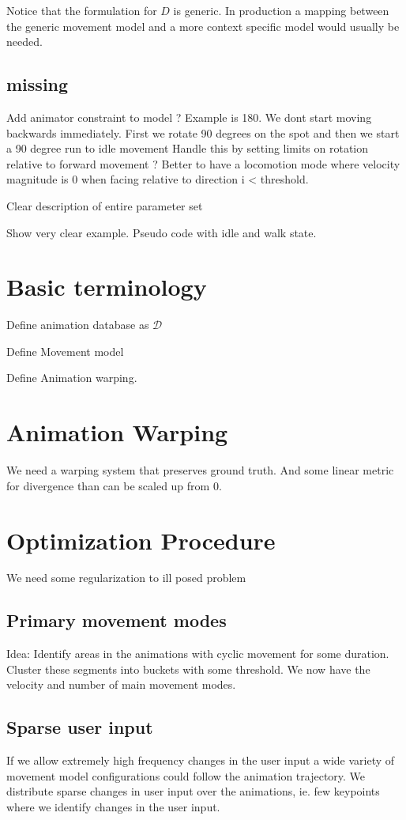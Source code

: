 Notice that the formulation for $D$ is generic. In production a mapping between the generic movement model and a more context specific model would usually be needed. 

\subsection{missing}
Add animator constraint to model ? Example is 180. We dont start moving backwards immediately. First we rotate 90 degrees on the spot and then we start a 90 degree run to idle movement
Handle this by setting limits on rotation relative to forward movement ? Better to have a locomotion mode where velocity magnitude is 0 when facing relative to direction i < threshold.

Clear description of entire parameter set

Show very clear example. Pseudo code with idle and walk state. 



\section{Basic terminology}
Define animation database as $\mathcal{D}$

Define Movement model

Define Animation warping.


\section{Animation Warping}
We need a warping system that preserves ground truth. And some linear metric for divergence than can be scaled up from 0.


\section{Optimization Procedure}
We need some regularization to ill posed problem
\subsection{Primary movement modes}
Idea: Identify areas in the animations with cyclic movement for some duration. Cluster these segments into buckets with some threshold. We now have the velocity and number of main movement modes.
\subsection{Sparse user input}
If we allow extremely high frequency changes in the user input a wide variety of movement model configurations could follow the animation trajectory. We distribute sparse changes in user input over the animations, ie. few keypoints where we identify changes in the user input.


